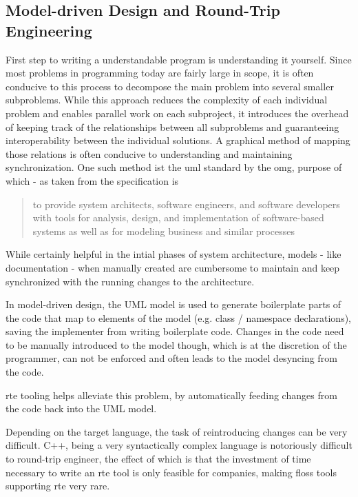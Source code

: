 \subsection{Model-driven Design and Round-Trip Engineering}
First step to writing a understandable program is understanding it yourself. Since most problems in programming today are fairly large in scope, it is often conducive to this process to decompose the main problem into several smaller subproblems. While this approach reduces the complexity of each individual problem and enables parallel work on each subproject, it introduces the overhead of keeping track of the relationships between all subproblems and guaranteeing interoperability between the individual solutions. A graphical method of mapping those relations is often conducive to understanding and maintaining synchronization. One such method ist the \gls{uml} standard by the \gls{omg}, purpose of which - as taken from the specification is 
\begin{quote}
to provide system architects, software engineers, and software developers with tools for analysis, design, and implementation of software-based systems as well as for modeling business and similar processes
\end{quote}

While certainly helpful in the intial phases of system architecture, models - like documentation - when manually created are cumbersome to maintain and keep synchronized with the running changes to the architecture.

In model-driven design, the UML model is used to generate boilerplate parts of the code that map to elements of the model (e.g. class / namespace declarations), saving the implementer from writing boilerplate code. Changes in the code need to be manually introduced to the model though, which is at the discretion of the programmer, can not be enforced and often leads to the model desyncing from the code. 

\gls{rte} tooling helps alleviate this problem, by automatically feeding changes from the code back into the UML model.

Depending on the target language, the task of reintroducing changes can be very difficult. C++, being a very syntactically complex language is notoriously difficult to round-trip engineer, the effect of which is that the investment of time necessary to write an \gls{rte} tool is only feasible for companies, making \gls{floss} tools supporting \gls{rte} very rare.

